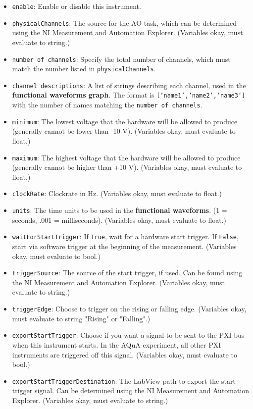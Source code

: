 \documentclass[pdftex,11pt,letterpaper]{article}
\begin{document}
\begin{itemize}
\item \texttt{enable}: Enable or disable this instrument.
\item \texttt{physicalChannels}:  The source for the AO task, which can be determined using the NI Measurement and Automation Explorer.  (Variables okay, must evaluate to string.)
\item \texttt{number of channels}:  Specify the total number of channels, which must match the number listed in \texttt{physicalChannels}.
\item \texttt{channel descriptions}:  A list of strings describing each channel, used in the \textbf{functional waveforms graph}.  The format is \texttt{['name1','name2','name3']} with the number of names matching the \texttt{number of channels}.
\item \texttt{minimum}:  The lowest voltage that the hardware will be allowed to produce (generally cannot be lower than -10 V).  (Variables okay, must evaluate to float.)
\item \texttt{maximum}:  The highest voltage that the hardware will be allowed to produce (generally cannot be higher than +10 V).  (Variables okay, must evaluate to float.)
\item \texttt{clockRate}:  Clockrate in Hz.  (Variables okay, must evaluate to float.)
\item \texttt{units}:  The time units to be used in the \textbf{functional waveforms}.  (1 = seconds, .001 = milliseconds).  (Variables okay, must evaluate to float.)
\item \texttt{waitForStartTrigger}:  If \texttt{True}, wait for a hardware start trigger.  If \texttt{False}, start via software trigger at the beginning of the measurement.  (Variables okay, must evaluate to bool.)
\item \texttt{triggerSource}:  The source of the start trigger, if used.  Can be found using the NI Measurement and Automation Explorer.  (Variables okay, must evaluate to string.)
\item \texttt{triggerEdge}:  Choose to trigger on the rising or falling edge.  (Variables okay, must evaluate to string "Rising" or "Falling".)
\item \texttt{exportStartTrigger}:  Choose if you want a signal to be sent to the PXI bus when this instrument starts.  In the AQuA experiment, all other PXI instruments are triggered off this signal.  (Variables okay, must evaluate to bool.)
\item \texttt{exportStartTriggerDestination}:  The LabView path to export the start trigger signal.  Can be determined using the NI Measurement and Automation Explorer.  (Variables okay, must evaluate to string.)

\end{itemize}
\end{document}
